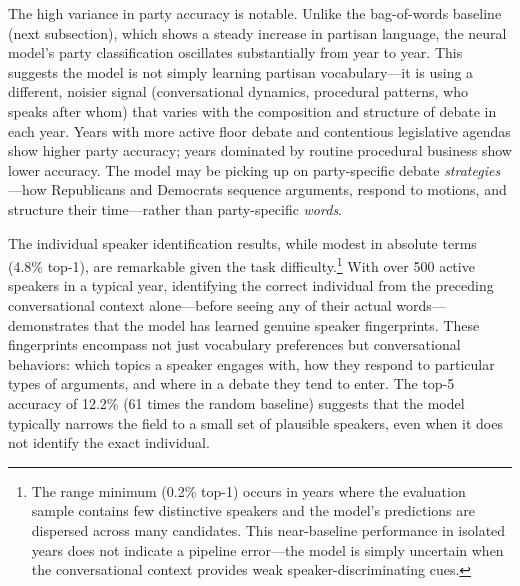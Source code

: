 \documentclass[12pt]{article}
\begin{document}
The high variance in party accuracy is notable. Unlike the bag-of-words baseline (next subsection), which shows a steady increase in partisan language, the neural model's party classification oscillates substantially from year to year. This suggests the model is not simply learning partisan vocabulary---it is using a different, noisier signal (conversational dynamics, procedural patterns, who speaks after whom) that varies with the composition and structure of debate in each year. Years with more active floor debate and contentious legislative agendas show higher party accuracy; years dominated by routine procedural business show lower accuracy. The model may be picking up on party-specific debate \textit{strategies}---how Republicans and Democrats sequence arguments, respond to motions, and structure their time---rather than party-specific \textit{words}.

The individual speaker identification results, while modest in absolute terms (4.8\% top-1), are remarkable given the task difficulty.\footnote{The range minimum (0.2\% top-1) occurs in years where the evaluation sample contains few distinctive speakers and the model's predictions are dispersed across many candidates. This near-baseline performance in isolated years does not indicate a pipeline error---the model is simply uncertain when the conversational context provides weak speaker-discriminating cues.} With over 500 active speakers in a typical year, identifying the correct individual from the preceding conversational context alone---before seeing any of their actual words---demonstrates that the model has learned genuine speaker fingerprints. These fingerprints encompass not just vocabulary preferences but conversational behaviors: which topics a speaker engages with, how they respond to particular types of arguments, and where in a debate they tend to enter. The top-5 accuracy of 12.2\% (61 times the random baseline) suggests that the model typically narrows the field to a small set of plausible speakers, even when it does not identify the exact individual.
\end{document}
